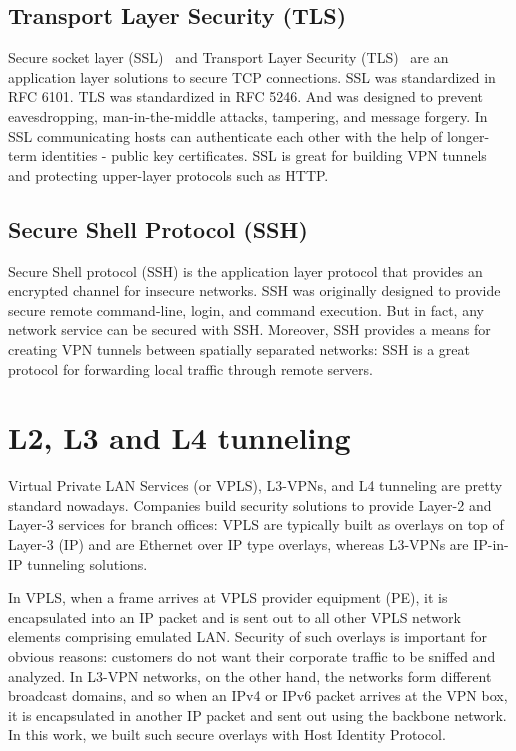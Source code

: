\subsection{Transport Layer Security (TLS)}
Secure socket layer (SSL)~\cite{ssl} and Transport Layer Security (TLS)~\cite{tls} are an application 
layer solutions to secure TCP connections. SSL was standardized in RFC 6101. 
TLS was standardized in RFC 5246. And was designed to prevent eavesdropping, 
man-in-the-middle attacks, tampering, and message forgery. In SSL communicating 
hosts can authenticate each other with the help of longer-term identities - public key certificates.
SSL is great for building VPN tunnels and protecting upper-layer protocols such as HTTP.


\subsection{Secure Shell Protocol (SSH)}

Secure Shell protocol (SSH) is the application layer protocol that provides an encrypted channel 
for insecure networks. SSH was originally designed to provide secure remote command-line, login, 
and command execution. But in fact, any network service can be secured with SSH. Moreover, SSH 
provides a means for creating VPN tunnels between spatially separated networks: SSH is a great 
protocol for forwarding local traffic through remote servers. 

\section{L2, L3 and L4 tunneling}

Virtual Private LAN Services (or VPLS), L3-VPNs, and L4 tunneling are pretty standard nowadays. 
Companies build security solutions to provide Layer-2 and Layer-3 services for branch offices: 
VPLS are typically built as overlays on top of Layer-3 (IP) and are Ethernet over IP type 
overlays, whereas L3-VPNs are IP-in-IP tunneling solutions.

In VPLS, when a frame arrives at VPLS provider equipment (PE), it is encapsulated 
into an IP packet and is sent out to all other VPLS network elements comprising emulated LAN. 
Security of such overlays is important for obvious reasons: customers do not want their corporate 
traffic to be sniffed and analyzed. In L3-VPN networks, on the other hand, the networks form different 
broadcast domains, and so when an IPv4 or IPv6 packet arrives at the VPN box, it is encapsulated in another 
IP packet and sent out using the backbone network. In this work, we built such secure overlays with 
Host Identity Protocol. 

